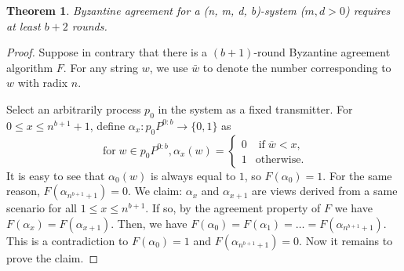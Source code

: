 \documentclass[11pt,conference,compsoc,onecolumn,romanappendices]{IEEEtran}
\newcommand{\nocomma}{}
\newcommand{\tmop}[1]{\ensuremath{\operatorname{#1}}}
\newtheorem{theorem}{Theorem}
\begin{document}
\begin{theorem}
  Byzantine agreement for a (n, m, d, b)-system ($m,
  d > 0$) requires at least $b + 2$ rounds.
\end{theorem}

\begin{proof}
  Suppose in contrary that there is a $(b + 1)$-round Byzantine agreement
  algorithm $F$. For any string $w$, we use $\bar{w}$ to denote the number
  corresponding to $w$ with radix $n$.
  
  Select an arbitrarily process $p_0$ in the system as a fixed transmitter.
  For $0 \leqslant x \leqslant n^{b + 1} + 1$, define $\alpha_x : p_0 P^{0 :
  b} \rightarrow \{ 0, 1 \}$ as
  \[ \tmop{for} w \in p_0 P^{0 : b} \nocomma, \alpha_x (w) = \left\{
     \begin{array}{ll}
       0 & \tmop{if} \overline{w} < x,\\
       1 & \tmop{otherwise.}
     \end{array} \right. \]
  It is easy to see that $\alpha_0 (w)$ is always equal to $1$, so $F
  (\alpha_0) = 1$. For the same reason, $F (\alpha_{n^{b + 1} + 1}) = 0$. We
  claim: $\alpha_x$ and $\alpha_{x + 1}$ are views derived from a same
  scenario for all $1 \leqslant x \leqslant n^{b + 1}$. If so, by the
  agreement property of $F$ we have $F (\alpha_x) = F (\alpha_{x + 1})$. Then,
  we have $F (\alpha_0) = F (\alpha_1) = \ldots = F (\alpha_{n^{b + 1} + 1})$.
  This is a contradiction to $F (\alpha_0) = 1$ and $F (\alpha_{n^{b + 1} +
  1}) = 0$. Now it remains to prove the claim.
  

\end{proof}
\end{document}
